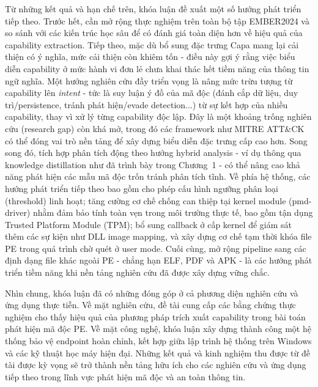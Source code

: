 Từ những kết quả và hạn chế trên, khóa luận đề xuất một số hướng
phát triển tiếp theo. Trước hết, cần mở rộng thực nghiệm trên toàn
bộ tập EMBER2024 và so sánh với các kiến trúc học sâu để có đánh giá
toàn diện hơn về hiệu quả của capability extraction. Tiếp theo, mặc
dù bổ sung đặc trưng Capa mang lại cải thiện có ý nghĩa, mức cải
thiện còn khiêm tốn - điều này gợi ý rằng việc biểu diễn capability ở mức hành
vi đơn lẻ chưa khai thác hết tiềm năng của thông tin ngữ nghĩa. Một
hướng nghiên cứu đầy triển vọng là nâng mức trừu tượng từ capability
lên \textit{intent} - tức là suy luận ý đồ của mã độc (đánh cắp dữ
liệu, duy trì/persistence, tránh phát hiện/evade detection...)
từ sự kết hợp của
nhiều capability, thay vì xử lý từng capability độc lập. Đây là một
khoảng trống nghiên cứu (research gap) còn khá mở, trong đó các framework như MITRE ATT\&CK có
thể đóng vai trò nền tảng để xây dựng biểu diễn đặc trưng cấp cao
hơn. Song song đó, tích hợp phân tích động theo hướng hybrid analysis
- ví dụ thông qua knowledge distillation như đã trình bày trong
Chương~1 - có thể nâng cao khả năng phát hiện các mẫu mã độc trốn
tránh phân tích tĩnh. Về phía hệ thống, các hướng phát triển
tiếp theo bao gồm cho phép cấu hình ngưỡng phân loại (threshold) linh hoạt;
tăng cường cơ chế chống can thiệp tại kernel module
(pmd-driver) nhằm đảm bảo tính toàn vẹn trong
môi trường thực tế, bao gồm tận dụng Trusted Platform Module (TPM);
bổ sung callback ở cấp kernel để giám sát thêm các sự kiện như DLL
image mapping, và xây dựng cơ chế tạm thời khóa file PE trong quá
trình chờ quét ở user mode. Cuối cùng, mở rộng pipeline sang các định
dạng file khác ngoài PE - chẳng hạn ELF, PDF và APK - là các
hướng phát triển tiềm năng khi nền tảng nghiên cứu đã được
xây dựng vững chắc.

Nhìn chung, khóa luận đã có những đóng góp ở cả phương diện
nghiên cứu và ứng dụng thực tiễn. Về mặt nghiên cứu, đề tài
cung cấp các bằng chứng thực nghiệm cho thấy hiệu quả của
phương pháp trích xuất capability trong bài toán phát hiện
mã độc PE. Về mặt công nghệ, khóa luận xây dựng thành công
một hệ thống bảo vệ endpoint hoàn chỉnh, kết hợp giữa lập
trình hệ thống trên Windows và các kỹ thuật học máy hiện đại.
Những kết quả và kinh nghiệm thu được từ đề tài được kỳ vọng
sẽ trở thành nền tảng hữu ích cho các nghiên cứu và ứng dụng
tiếp theo trong lĩnh vực phát hiện mã độc và an toàn thông tin.
